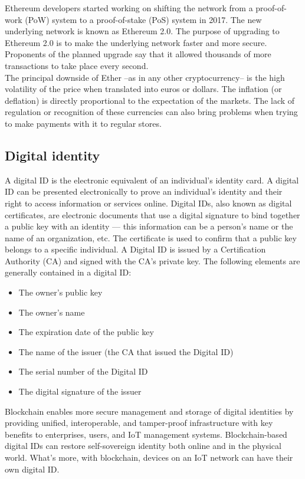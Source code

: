 \documentclass[10pt]{article}
\begin{document}
\begin{multicols}{2}
Ethereum developers started working on shifting the network from a proof-of-work (PoW) system to a proof-of-stake (PoS) system in 2017. The new underlying network is known as Ethereum 2.0. The purpose of upgrading to Ethereum 2.0 is to make the underlying network faster and more secure. Proponents of the planned upgrade say that it allowed thousands of more transactions to take place every second.\\

The principal downside of Ether --as in any other cryptocurrency-- is the high volatility of the price when translated into euros or dollars. The inflation (or deflation) is directly proportional to the expectation of the markets. The lack of regulation or recognition of these currencies can also bring problems when trying to make payments with it to regular stores.

\subsection{Digital identity}

A digital ID is the electronic equivalent of an individual's identity card. A digital ID can be presented electronically to prove an individual's identity and their right to access information or services online. Digital IDs, also known as digital certificates, are electronic documents that use a digital signature to bind together a public key with an identity — this information can be a person's name or the name of an organization, etc. The certificate is used to confirm that a public key belongs to a specific individual. A Digital ID is issued by a Certification Authority (CA) and signed with the CA's private key. The following elements are generally contained in a digital ID:

\begin{itemize}
	\item The owner's public key
	\item The owner's name
	\item The expiration date of the public key
	\item The name of the issuer (the CA that issued the Digital ID)
	\item The serial number of the Digital ID
	\item The digital signature of the issuer
\end{itemize}

Blockchain enables more secure management and storage of digital identities by providing unified, interoperable, and tamper-proof infrastructure with key benefits to enterprises, users, and IoT management systems. Blockchain-based digital IDs can restore self-sovereign identity both online and in the physical world. What's more, with blockchain, devices on an IoT network can have their own digital ID.\\


\end{multicols}
\end{document}
